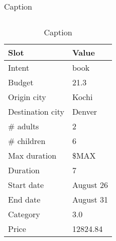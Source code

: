 \begin{table}
\begin{subtable}[t]{0.3\textwidth}
\begin{tabular}[t]{ll}
        \end{tabular}
        \caption{Frame 2}
    \end{subtable}
    \hspace{\fill}
    \begin{subtable}[t]{0.3\textwidth}
        \centering
        \begin{tabular}[t]{ll}
            \toprule
            Slot & Value \\
            \midrule
            Intent & book \\
            Budget & 21.3 \\
            Origin city & Kochi \\
            Destination city & Denver \\
            \# adults & 2 \\
            \# children & 6 \\
            Max duration & \$MAX \\
            Duration & 7 \\
            Start date & August 26 \\
            End date & August 31 \\
            Category & 3.0 \\
            Price & 12824.84 \\
            \bottomrule
        \end{tabular}
        \caption{Frame 3}
    \end{subtable}
    \caption{Caption}
    \label{tab:ex-frames2}
\end{table}
\fi


